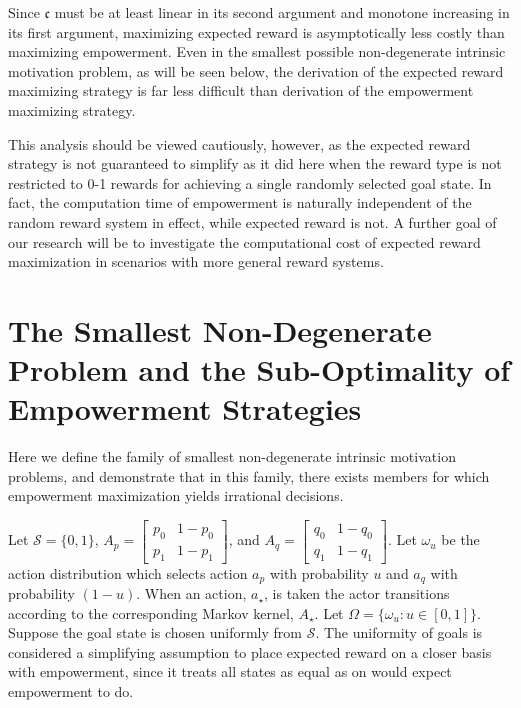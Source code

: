 \documentclass{article}
\newcommand{\Ss}{\mathcal{S}}
\begin{document}

Since $\mathfrak{c}$ must be at least linear in its second argument and monotone increasing in its first argument, maximizing expected reward is asymptotically less costly than maximizing empowerment. Even in the smallest possible non-degenerate intrinsic motivation problem, as will be seen below, the derivation of the expected reward maximizing strategy is far less difficult than derivation of the empowerment maximizing strategy. 

This analysis should be viewed cautiously, however, as the expected reward strategy is not guaranteed to simplify as it did here when the reward type is not restricted to 0-1 rewards for achieving a single randomly selected goal state.  In fact, the computation time of empowerment is naturally independent of the random reward system in effect, while expected reward is not. A further goal of our research will be to investigate the computational cost of expected reward maximization in scenarios with more general reward systems.

\section{The Smallest Non-Degenerate Problem and the Sub-Optimality of Empowerment Strategies}
Here we define the family of smallest non-degenerate intrinsic motivation problems, and demonstrate that in this family, there exists members for which empowerment maximization yields irrational decisions.

Let $\Ss=\{0,1\}$, $A_p=\left[\begin{matrix} p_0 & 1-p_0 \\ p_1 & 1-p_1\end{matrix}\right]$, and $A_q=\left[\begin{matrix} q_0 & 1-q_0 \\ q_1 & 1-q_1\end{matrix}\right]$. Let $\omega_u$ be the action distribution which selects action $a_p$ with probability $u$ and $a_q$ with probability $(1-u)$. When an action, $a_\star$, is taken the actor transitions according to the corresponding Markov kernel, $A_\star$. Let $\Omega=\{\omega_u:u\in[0,1]\}$. Suppose the goal state is chosen uniformly from $\Ss$. The uniformity of goals is considered a simplifying assumption to place expected reward on a closer basis with empowerment, since it treats all states as equal as on would expect empowerment to do.
\end{document}
